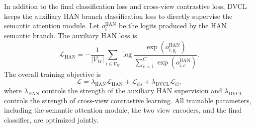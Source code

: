 In addition to the final classification loss and cross-view contrastive loss, DVCL keeps the auxiliary HAN branch classification loss to directly supervise the semantic attention module. Let $o_i^{\mathrm{HAN}}$ be the logits produced by the HAN semantic branch. The auxiliary HAN loss is
\begin{equation}
\mathcal{L}_{\mathrm{HAN}}
=
-\frac{1}{|\mathcal{V}_{\mathrm{tr}}|}
\sum_{i\in\mathcal{V}_{\mathrm{tr}}}
\log
\frac{\exp(o^{\mathrm{HAN}}_{i,y_i})}
{\sum_{c=1}^{C}\exp(o^{\mathrm{HAN}}_{i,c})}.
\end{equation}
The overall training objective is
\begin{equation}
\mathcal{L}
=
\lambda_{\mathrm{HAN}}\mathcal{L}_{\mathrm{HAN}}
+
\mathcal{L}_{\mathrm{cls}}
+
\lambda_{\mathrm{DVCL}}\mathcal{L}_{\mathrm{cl}},
\end{equation}
where $\lambda_{\mathrm{HAN}}$ controls the strength of the auxiliary HAN supervision and $\lambda_{\mathrm{DVCL}}$ controls the strength of cross-view contrastive learning. All trainable parameters, including the semantic attention module, the two view encoders, and the final classifier, are optimized jointly.




